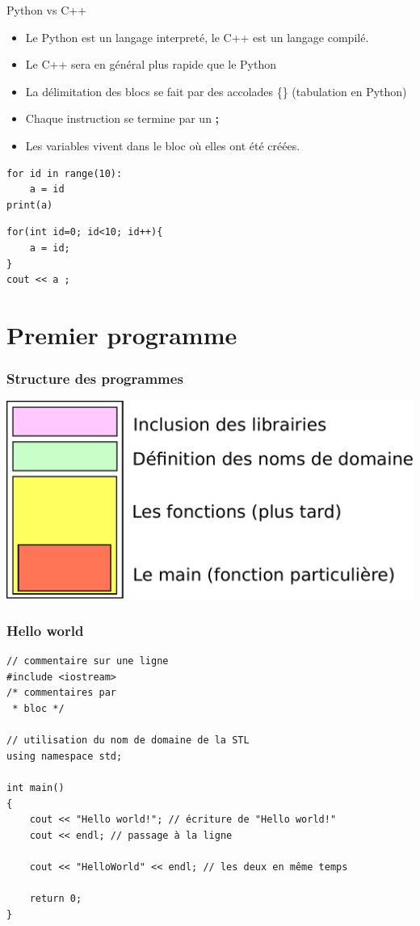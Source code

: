 \begin{frame}[fragile]{Python vs C++}
	\begin{itemize}
		\item Le Python est un langage interpreté, le C++ est un langage compilé.
		\item Le C++ sera en général plus rapide que le Python
		\item La délimitation des blocs se fait par des accolades \{\} (tabulation en Python)
		\item Chaque instruction se termine par un {\huge\textbf{;}}
		\item Les variables vivent dans le bloc où elles ont été créées.
	\end{itemize}
	\begin{minipage}{0.45\linewidth}
		\begin{verbatim}
for id in range(10):
    a = id
print(a)
		\end{verbatim}
	\end{minipage}
	\hfill
	\begin{minipage}{0.45\linewidth}
		\begin{verbatim}
for(int id=0; id<10; id++){
    a = id;
}
cout << a ;
		\end{verbatim}
	\end{minipage}
\end{frame}


\section{Premier programme}

\begin{frame}
  \frametitle{Structure des programmes}
  \centering
  \includegraphics[width=\linewidth]{images/structure.pdf}
\end{frame}

\begin{frame}[fragile]
  \frametitle{Hello world}

  \begin{verbatim}
// commentaire sur une ligne
#include <iostream>
/* commentaires par
 * bloc */

// utilisation du nom de domaine de la STL
using namespace std;

int main()
{
    cout << "Hello world!"; // écriture de "Hello world!"
    cout << endl; // passage à la ligne

    cout << "HelloWorld" << endl; // les deux en même temps

    return 0;
}
	\end{verbatim}
\end{frame}

